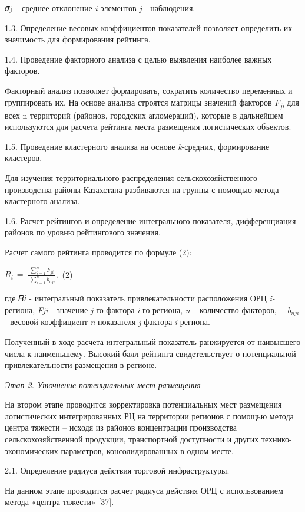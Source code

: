 𝜎j -- среднее отклонение \emph{i-}элементов \emph{j -} наблюдения.

1.3. Определение весовых коэффициентов показателей позволяет определить
их значимость для формирования рейтинга.

1.4. Проведение факторного анализа с целью выявления наиболее важных
факторов.

Факторный анализ позволяет формировать, сократить количество переменных
и группировать их. На основе анализа строятся матрицы значений факторов
\emph{F\textsubscript{ji}} для всех n территорий (районов, городских
агломераций), которые в дальнейшем используются для расчета рейтинга
места размещения логистических объектов.

1.5. Проведение кластерного анализа на основе \emph{k}-средних,
формирование кластеров.

Для изучения территориального распределения сельскохозяйственного
производства районы Казахстана разбиваются на группы с помощью метода
кластерного анализа.

1.6. Расчет рейтингов и определение интегрального показателя,
дифференциация районов по уровню рейтингового значения.

Расчет самого рейтинга проводится по формуле (2):

\(R_{i\ } = \ \frac{\sum_{i = 1}^{n}F_{ji}}{\ \sum_{i = 1}^{n}b_{nji}},\)
(2)

где 𝑅𝑖 - интегральный показатель привлекательности расположения ОРЦ
\emph{i-} региона, \emph{Fji -} значение \emph{j-}го фактора \emph{i}-го
региона, \emph{n} -- количество факторов,\({\ \ \ \ \ \ b}_{nji\ }\)-
весовой коэффициент \emph{n} показателя \emph{j} фактора \emph{i}
региона.

Полученный в ходе расчета интегральный показатель ранжируется от
наивысшего числа к наименьшему. Высокий балл рейтинга свидетельствует о
потенциальной привлекательности размещения в регионе.

\emph{Этап 2. Уточнение потенциальных мест размещения}

На втором этапе проводится корректировка потенциальных мест размещения
логистических интегрированных РЦ на территории регионов с помощью метода
центра тяжести -- исходя из районов концентрации производства
сельскохозяйственной продукции, транспортной доступности и других
технико-экономических параметров, консолидированных в одном месте.

2.1. Определение радиуса действия торговой инфраструктуры.

На данном этапе проводится расчет радиуса действия ОРЦ с использованием
метода «центра тяжести» {[}37{]}.

